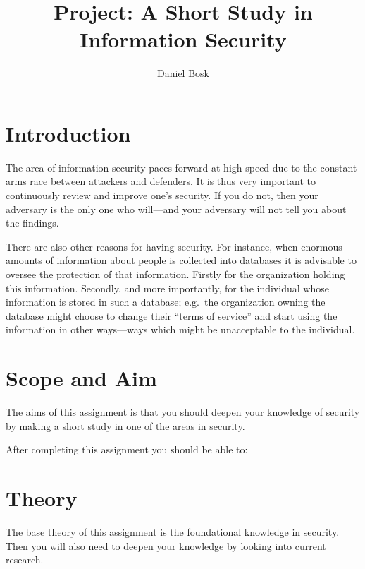 \documentclass[a4paper]{llncs}
\title{Project: A Short Study in Information Security}
\author{%
  Daniel Bosk
}
\institute{%
  Department of Information and Communication Systems\\
  Mid Sweden University, Sundsvall
}
\begin{document}
\maketitle


\section{Introduction}
\label{sec:intro}
The area of information security paces forward at high speed due to the 
constant arms race between attackers and defenders.
It is thus very important to continuously review and improve one's security.
If you do not, then your adversary is the only one who will---and your 
adversary will not tell you about the findings.

There are also other reasons for having security.
For instance, when enormous amounts of information about people is collected 
into databases it is advisable to oversee the protection of that information.
Firstly for the organization holding this information.
Secondly, and more importantly, for the individual whose information is stored 
in such a database; e.g.~the organization owning the database might choose to 
change their \enquote{terms of service} and start using the information in 
other ways---ways which might be unacceptable to the individual.


\section{Scope and Aim}
\label{sec:goal}
The aims of this assignment is that you should deepen your knowledge of 
security by making a short study in one of the areas in security.

After completing this assignment you should be able to:
\begin{itemize}
	
\end{itemize}


\section{Theory}

The base theory of this assignment is the foundational knowledge in security.
Then you will also need to deepen your knowledge by looking into current 
research.
\end{document}
